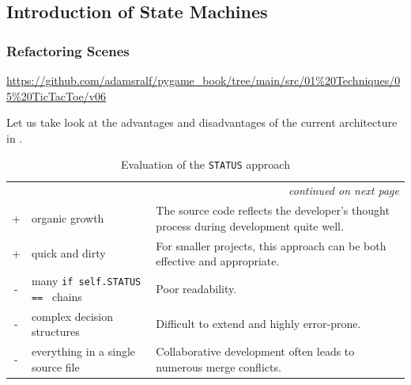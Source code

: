 

\subsection{Introduction of State Machines}

\subsubsection{Refactoring Scenes}
\begin{diskbox}
	\url{https://github.com/adamsralf/pygame_book/tree/main/src/01%20Techniques/05%20TicTacToe/v06}
\end{diskbox}

Let us take look at the advantages and disadvantages of the current architecture in .


\begin{longtable}{clp{7.7cm}}
	\caption{Evaluation of the \texttt{STATUS} approach}\label{tabStatusApproach}\\
	\toprule
	\endfirsthead
	
	\toprule
	\endhead
	
	\midrule
	\multicolumn{3}{r}{\emph{continued on next page}} \\
	\endfoot
	
	\bottomrule
	\endlastfoot
	
	\rowcolor{green!20}+ & organic growth & The source code reflects the developer's thought process during development quite well. \\ \midrule
	\rowcolor{green!20}+ & quick and dirty & For smaller projects, this approach can be both effective and appropriate. \\ \midrule
	\rowcolor{red!20}- & many \texttt{if self.STATUS == } chains & Poor readability. \\ \midrule
	\rowcolor{red!20}- & complex decision structures & Difficult to extend and highly error-prone. \\  \midrule
	\rowcolor{red!20}- & everything in a single source file & Collaborative development often leads to numerous merge conflicts. \\
\end{longtable}


